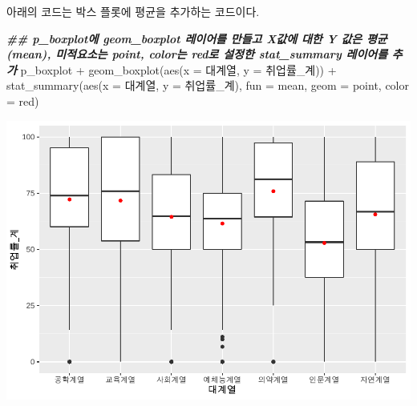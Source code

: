 \documentclass[
]{article}
\newenvironment{Shaded}{\begin{snugshade}}{\end{snugshade}}
\newcommand{\AttributeTok}[1]{\textcolor[rgb]{0.77,0.63,0.00}{#1}}
\newcommand{\DocumentationTok}[1]{\textcolor[rgb]{0.56,0.35,0.01}{\textbf{\textit{#1}}}}
\newcommand{\FunctionTok}[1]{\textcolor[rgb]{0.00,0.00,0.00}{#1}}
\newcommand{\NormalTok}[1]{#1}
\newcommand{\SpecialCharTok}[1]{\textcolor[rgb]{0.00,0.00,0.00}{#1}}
\newcommand{\StringTok}[1]{\textcolor[rgb]{0.31,0.60,0.02}{#1}}
\begin{document}
아래의 코드는 박스 플롯에 평균을 추가하는 코드이다.

\begin{Shaded}
\begin{Highlighting}[]
\DocumentationTok{\#\# p\_boxplot에 geom\_boxplot 레이어를 만들고 X값에 대한 Y 값은 평균(mean), 미적요소는 point, color는 \textquotesingle{}red\textquotesingle{}로 설정한 stat\_summary 레이어를 추가}
\NormalTok{p\_boxplot }\SpecialCharTok{+} 
  \FunctionTok{geom\_boxplot}\NormalTok{(}\FunctionTok{aes}\NormalTok{(}\AttributeTok{x =}\NormalTok{ 대계열, }\AttributeTok{y =}\NormalTok{ 취업률\_계)) }\SpecialCharTok{+}
  \FunctionTok{stat\_summary}\NormalTok{(}\FunctionTok{aes}\NormalTok{(}\AttributeTok{x =}\NormalTok{ 대계열, }\AttributeTok{y =}\NormalTok{ 취업률\_계), }\AttributeTok{fun =} \StringTok{\textquotesingle{}mean\textquotesingle{}}\NormalTok{, }\AttributeTok{geom =} \StringTok{\textquotesingle{}point\textquotesingle{}}\NormalTok{, }\AttributeTok{color =} \StringTok{\textquotesingle{}red\textquotesingle{}}\NormalTok{)}
\end{Highlighting}
\end{Shaded}

\includegraphics{chap3_files/figure-latex/unnamed-chunk-53-1.pdf}
\end{document}
